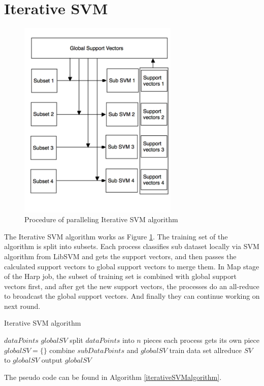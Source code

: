 \section{Iterative SVM}
\begin{figure}[htbp]
\centering
\includegraphics[width=3.0in]{image/iterativeSVM.png}
\caption{Procedure of paralleling Iterative SVM algorithm}
\label{iterativeSVM}
\end{figure}

The Iterative SVM algorithm works as Figure \ref{iterativeSVM}. The training set of the algorithm is split into subsets. Each process classifies sub dataset locally via SVM algorithm from LibSVM and gets the support vectors, and then passes the calculated support vectors to global support vectors to merge them. In Map stage of the Harp job, the subset of training set is combined with global support vectors first, and after get the new support vectors, the processes do an all-reduce to broadcast the global support vectors. And finally they can continue working on next round.

\begin{algorithm}
\caption{Iterative SVM algorithm}
\label{iterativeSVMalgorithm}
\begin{algorithmic}
\REQUIRE $dataPoints$
\ENSURE $globalSV$
\STATE split $dataPoints$ into $n$ pieces
\STATE each process gets its own piece
\STATE $globalSV=\{\}$
\STATE combine $subDataPoints$ and $globalSV$
\STATE train data set
\STATE allreduce $SV$ to $globalSV$
\ENDFOR
{}
\STATE output $globalSV$
\ENDIF
\end{algorithmic}  
\end{algorithm}

The pseudo code can be found in Algorithm \ref{iterativeSVMalgorithm}.